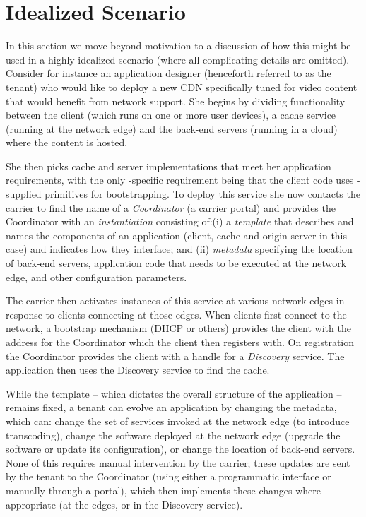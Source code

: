 \section{Idealized Scenario}
\label{sec:scenario}

In this section we move beyond motivation to a discussion of how this \name might be used in a highly-idealized scenario (where all complicating details are omitted). Consider for instance an application designer (henceforth referred to as the tenant) who would like to deploy a new CDN specifically tuned for video content that would benefit from network support. She begins by dividing functionality between the client (which runs on one or more user devices), a cache service (running at the network edge) and the back-end servers (running in a cloud) where the content is hosted. 

She then picks cache and server implementations that meet her application requirements, with the only \name-specific requirement being that the client code uses \name-supplied primitives for bootstrapping. To deploy this service she now contacts the carrier to find the name of a {\em Coordinator} (a carrier portal) and provides the Coordinator with an {\em instantiation} consisting of:(i) a {\em template} that describes and names the components of an application (\ie client, cache and origin server in this case) and indicates how they interface; and (ii) {\em metadata} specifying the location of back-end servers, application code that needs to be executed at the network edge, and other configuration parameters.

The carrier then activates instances of this service at various network edges in response to clients connecting at those edges. When clients first connect to the network, a bootstrap mechanism (DHCP or others) provides the client with the address for the Coordinator which the client then registers with. On registration the Coordinator provides the client with a handle for a {\em Discovery} service. The application then uses the Discovery service to find the cache.

While the template -- which dictates the overall structure of the application -- remains fixed, a tenant can evolve an application by changing the metadata, which can: change the set of services invoked at the network edge (\eg to introduce transcoding), change the software deployed at the network edge (\eg upgrade the software or update its configuration), or change the location of back-end servers. None of this requires manual intervention by the carrier; these updates are sent by the tenant to the Coordinator (using either a programmatic interface or manually through a portal), which then implements these changes where appropriate (at the edges, or in the Discovery service).

